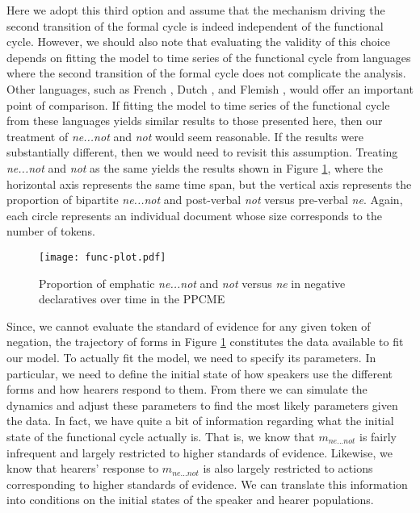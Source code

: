 \documentclass[linguex]{sp}
\theoremstyle{definition} \newtheorem{definition}{Definition}
\begin{document}
Here we adopt this third option and assume that the mechanism driving the second transition of the formal cycle is indeed independent of the functional cycle. However, we should also note that evaluating the validity of this choice depends on fitting the model to time series of the functional cycle from languages where the second transition of the formal cycle does not complicate the analysis. Other languages, such as French \citep{martineau-mougeon2003}, Dutch \citep{burridge1993}, and Flemish \citep{vanderAuwera-neuckermans2004}, would offer an important point of comparison.  If fitting the model to time series of the functional cycle from these languages yields similar results to those presented here, then our treatment of \textit{\color{blue} ne...not} and \textit{\color{green} not} would seem reasonable. If the results were substantially different, then we would need to revisit this assumption.   Treating \textit{\color{blue} ne...not} and \textit{\color{green} not} as the same yields the results shown in Figure \ref{func-plot}, where the horizontal axis represents the same time span, but the vertical axis represents the proportion of bipartite \textit{\color{blue} ne...not} and post-verbal  \textit{\color{green} not} versus pre-verbal \textit{\color{red} ne}. Again, each circle represents an individual document whose size corresponds to the number of tokens.


\begin{figure}
\centering
     \texttt{[image: func-plot.pdf]}
\caption{Proportion of emphatic \textit{\color{blue} ne...not} and \textit{\color{green} not}  versus  \textit{\color{red}  ne} in negative declaratives over time in the PPCME}
\label{func-plot}
\end{figure}

Since, we cannot evaluate the standard of evidence for any given token of negation, the trajectory of forms in Figure \ref{func-plot} constitutes the data available to fit our model. To actually fit the model, we need to specify its parameters. In particular, we need to define the initial state of how speakers use the different forms and how hearers respond to them. From there we can simulate the dynamics and adjust these parameters to find the most likely parameters given the data.  In fact, we have quite a bit of information regarding what the initial state of the functional cycle actually is. That is, we know that \textit{\color{blue} $m_{ne...not}$}  is fairly infrequent and largely restricted to higher standards of evidence. Likewise, we know that hearers' response to \textit{\color{blue} $m_{ne...not}$}  is also largely restricted to actions corresponding to higher standards of evidence. We can translate this information into conditions on the initial states of the speaker and hearer populations.
\end{document}
